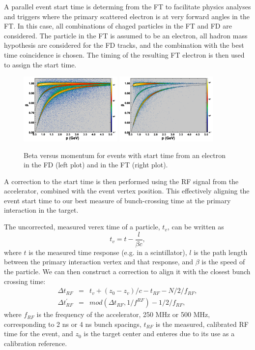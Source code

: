 A parallel event start time is determing from the FT to facilitate physics analyses and triggers where the primary scattered electron is at very forward angles in the FT.  In this case, all combinations of chaged particles in the FT and FD are considered.  The particle in the FT is assumed to be an electron, all hadron mass hypothesis are considered for the FD tracks, and the combination with the best time coincidence is chosen.  The timing of the resulting FT electron is then used to assign the start time.

\begin{figure}
\centering
\includegraphics[width=0.45\textwidth]{pics/ftof_betap.png}
\includegraphics[width=0.45\textwidth]{pics/ft_betap.png}
\caption{Beta versus momentum for events with start time from an electron in the FD (left plot) and in the FT (right plot).}
\label{fig:betavsp}
\end{figure}

A correction to the start time is then performed using the RF signal from the accelerator, combined with the event vertex position.  This effectively aligning the event start time to our best measure of bunch-crossing time at the primary interaction in the target.

The uncorrected, measured verex time of a particle, $t_v$, can be written as
\begin{equation}
    t_v = t-\frac{l}{\beta c},
\end{equation}
where $t$ is the measured time response (e.g. in a scintillator), $l$ is the path length between the primary interaction vertex and that response, and $\beta$ is the speed of the particle.  We can then construct a correction to align it with the closest bunch crossing time:
\begin{eqnarray*}
\Delta t_{RF} &=& t_v + (z_0-z_v)/c - t_{RF} - N/2/f_{RF}, \\
\Delta t^{\prime}_{RF} &=& mod(\Delta t_{RF},1/f^{RF})-1/2/f_{RF},
\end{eqnarray*}
where $f_{RF}$ is the frequency of the accelerator, 250 MHz or 500 MHz, corresponding to 2 ns or 4 ns bunch spacings, $t_{RF}$ is the measured, calibrated RF time for the event, and $z_0$ is the target center and enteres due to its use as a calibration reference.

